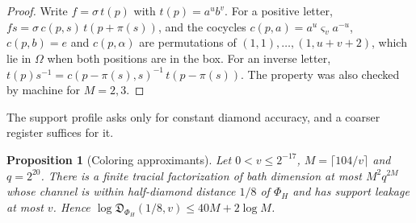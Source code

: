 \documentclass[11pt,a4paper]{article}
\theoremstyle{plain}
\newtheorem{proposition}[theorem]{Proposition}
\theoremstyle{definition}
\theoremstyle{remark}
\newcommand{\Dsupp}{\mathfrak{D}}
\begin{document}
\begin{proof}
Write $f=\sigma\,t(p)$ with $t(p)=a^ub^v$. For a positive letter, $fs=\sigma\,c(p,s)\,t(p+\pi(s))$, and the cocycles
$c(p,a)=a^u\varsigma_va^{-u}$, $c(p,b)=e$ and $c(p,\alpha)$ are permutations of $(1,1),\dots,(1,u+v+2)$, which lie in
$\Omega$ when both positions are in the box. For an inverse letter, $t(p)s^{-1}=c(p-\pi(s),s)^{-1}\,t(p-\pi(s))$. The
property was also checked by machine for $M=2,3$.
\end{proof}

The support profile asks only for constant diamond accuracy, and a coarser register suffices for it.

\begin{proposition}[Coloring approximants]\label{prop:coloring}
Let $0<v\le2^{-17}$, $M=\lceil104/v\rceil$ and $q=2^{20}$. There is a finite tracial factorization of bath dimension at most
$M^2q^{2M}$ whose channel is within half-diamond distance $1/8$ of $\Phi_H$ and has support leakage at most $v$. Hence
$\log\Dsupp_{\Phi_H}(1/8,v)\le40M+2\log M$.
\end{proposition}
\end{document}
